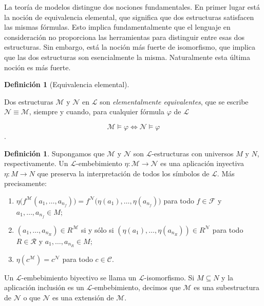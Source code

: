 \documentclass[11pt,a4paper]{book}
\theoremstyle{plain}
\theoremstyle{definition}
\newtheorem{definicion}[teorema]{Definición}
\theoremstyle{remark}
\begin{document}
La teoría de modelos distingue dos nociones fundamentales. En primer lugar está la noción de equivalencia elemental, que significa que dos estructuras satisfacen las mismas fórmulas. Esto implica fundamentalmente que el lenguaje en consideración no proporciona las herramientas para distinguir entre esas dos estructuras. Sin embargo, está la noción más fuerte de isomorfismo, que implica que las dos estructuras son esencialmente la misma. Naturalmente esta última noción es más fuerte.

\begin{definicion} [Equivalencia elemental]
  \label{equivalencia-elemental}
  
  Dos estructuras $\mathcal{M}$ y $\mathcal{N}$ en $\mathcal{L}$ son \textit{elementalmente equivalentes}, que se escribe $\mathcal{N} \equiv \mathcal{M}$, siempre y cuando, para cualquier fórmula $\varphi$ de $\mathcal{L}$

  $$ \mathcal{M} \models \varphi \Longleftrightarrow \mathcal{N} \models \varphi $$.


\end{definicion}

\begin{definicion}\label{isomorfismo-embebimiento}
Supongamos que $\mathcal{M}$ y $\mathcal{N}$ son $\mathcal{L}$-estructuras con universos $M$ y $N$, respectivamente. Un $\mathcal{L}$-embebimiento $\eta : \mathcal{M} \to \mathcal{N}$ es una aplicación inyectiva $\eta : M \to N$ que preserva la interpretación de todos los símbolos de $\mathcal{L}$. Más precisamente:
\begin{enumerate}
    \item[(i)] $\eta\big(f^{\mathcal{M}}(a_1,\ldots,a_{n_f})\big)
    = f^{\mathcal{N}}\big(\eta(a_1),\ldots,\eta(a_{n_f})\big)$ para todo $f \in \mathcal{F}$ y $a_1,\ldots,a_{n_f} \in M$;
    
    \item[(ii)] $(a_1,\ldots,a_{n_R}) \in R^{\mathcal{M}}$ si y sólo si 
    $(\eta(a_1),\ldots,\eta(a_{n_R})) \in R^{\mathcal{N}}$ para todo $R \in \mathcal{R}$ y $a_1,\ldots,a_{n_R} \in M$;
    
    \item[(iii)] $\eta(c^{\mathcal{M}}) = c^{\mathcal{N}}$ para todo $c \in \mathcal{C}$.
\end{enumerate}

Un $\mathcal{L}$-embebimiento biyectivo se llama un $\mathcal{L}$-isomorfismo. Si $M \subseteq N$ y la aplicación inclusión es un $\mathcal{L}$-embebimiento, decimos que $\mathcal{M}$ es una subestructura de $\mathcal{N}$ o que $\mathcal{N}$ es una extensión de $\mathcal{M}$.
\end{definicion}
\end{document}

